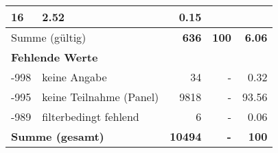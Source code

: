 \begin{longtable}{lXrrr}
       \num{16} &
       \num[round-mode=places,round-precision=2]{2,52} &
         \num[round-mode=places,round-precision=2]{0,15} \\
     \midrule
     \multicolumn{2}{l}{Summe (gültig)} &
       \textbf{\num{636}} &
     \textbf{100} &
       \textbf{\num[round-mode=places,round-precision=2]{6,06}} \\
     \multicolumn{5}{l}{\textbf{Fehlende Werte}}\\
       -998 &
       keine Angabe &
         \num{34} &
        - &
         \num[round-mode=places,round-precision=2]{0,32} \\
       -995 &
       keine Teilnahme (Panel) &
         \num{9818} &
        - &
         \num[round-mode=places,round-precision=2]{93,56} \\
       -989 &
       filterbedingt fehlend &
         \num{6} &
        - &
         \num[round-mode=places,round-precision=2]{0,06} \\
     \midrule
     \multicolumn{2}{l}{\textbf{Summe (gesamt)}} &
          \textbf{\num{10494}} &
        \textbf{-} &
        \textbf{100} \\
     \bottomrule
     \end{longtable}
     
